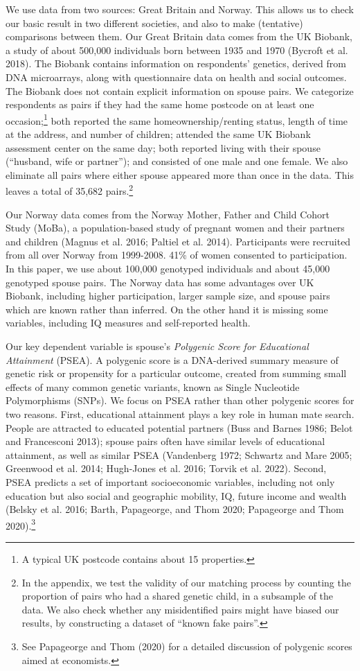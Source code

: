 \documentclass[
  12pt,
]{article}
\theoremstyle{definition}
\theoremstyle{definition}
\theoremstyle{definition}
\theoremstyle{definition}
\theoremstyle{remark}
\begin{document}
We use data from two sources: Great Britain and Norway. This allows us to
check our basic result in two different societies, and also to make
(tentative) comparisons between them. Our Great Britain data
comes from the UK Biobank, a study of about 500,000 individuals born between
1935 and 1970 (Bycroft et al. 2018). The Biobank contains information on respondents'
genetics, derived from DNA microarrays, along with questionnaire data on health
and social outcomes. The Biobank does not contain explicit information on spouse
pairs. We categorize respondents as pairs if they had the same home postcode on at least
one occasion;\footnote{A typical UK postcode contains about 15 properties.} both reported the same homeownership/renting status, length of time
at the address, and number of children; attended the same UK Biobank assessment
center on the same day; both reported living with their spouse (``husband, wife or
partner''); and consisted of one male and one female.
We also eliminate all pairs where either spouse appeared more than once
in the data. This leaves a total of 35,682 pairs.\footnote{In the appendix, we test the validity of our matching process by
  counting the proportion of pairs who had a shared genetic child, in a subsample
  of the data. We also check whether any misidentified pairs might have biased our
  results, by constructing a dataset of ``known fake pairs''.}

Our Norway data comes from the Norway Mother, Father and Child Cohort Study
(MoBa), a population-based study of pregnant women and their partners and children
(Magnus et al. 2016; Paltiel et al. 2014). Participants were recruited from all
over Norway from 1999-2008. 41\% of women consented to participation. In this
paper, we use about 100,000 genotyped individuals and about 45,000 genotyped
spouse pairs. The Norway data has some advantages over UK Biobank, including higher
participation, larger sample size, and spouse pairs which are known rather than
inferred. On the other hand it is missing some variables, including IQ measures
and self-reported health.

Our key dependent variable is spouse's \emph{Polygenic Score for Educational
Attainment} (PSEA). A polygenic score is a DNA-derived summary measure
of genetic risk or propensity for a particular outcome, created from
summing small effects of many common genetic variants, known as Single
Nucleotide Polymorphisms (SNPs). We focus on PSEA rather than other
polygenic scores for two reasons. First, educational attainment plays a key role in
human mate search. People are attracted to educated potential partners
(Buss and Barnes 1986; Belot and Francesconi 2013); spouse pairs often have
similar levels of educational attainment, as well as similar PSEA
(Vandenberg 1972; Schwartz and Mare 2005; Greenwood et al. 2014; Hugh-Jones et al. 2016; Torvik et al. 2022). Second, PSEA predicts a set of
important socioeconomic variables, including not only education but also social
and geographic mobility, IQ, future income and wealth (Belsky et al. 2016; Barth, Papageorge, and Thom 2020; Papageorge and Thom 2020).\footnote{See Papageorge and Thom (2020) for a detailed discussion of polygenic
  scores aimed at economists.}
\end{document}
